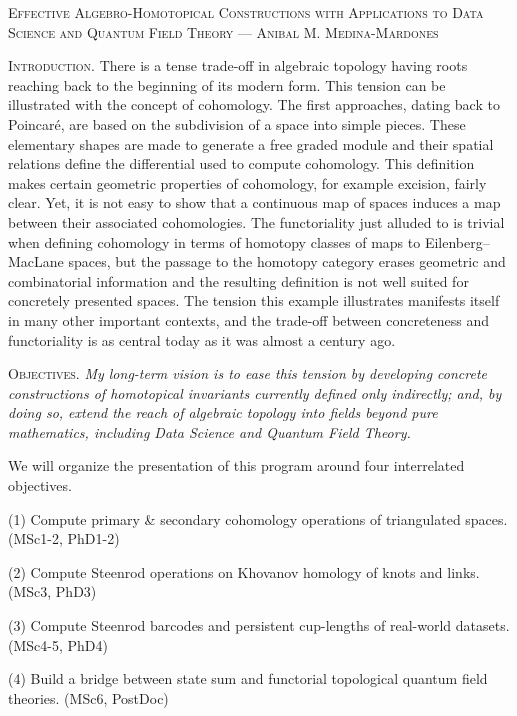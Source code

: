 
\textsc{\large Effective Algebro-Homotopical Constructions with Applications to Data Science and Quantum Field Theory}
--- \hfill \textsc{\large Anibal M. Medina-Mardones}

\bigskip\textsc{Introduction}.
There is a tense trade-off in algebraic topology having roots reaching back to the beginning of its modern form.
This tension can be illustrated with the concept of cohomology.
The first approaches, dating back to Poincar\'e, are based on the subdivision of a space into simple pieces.
These elementary shapes are made to generate a free graded module and their spatial relations define the differential used to compute cohomology.
This definition makes certain geometric properties of cohomology, for example excision, fairly clear.
Yet, it is not easy to show that a continuous map of spaces induces a map between their associated cohomologies.
The functoriality just alluded to is trivial when defining cohomology in terms of homotopy classes of maps to Eilenberg--MacLane spaces, but the passage to the homotopy category erases geometric and combinatorial information and the resulting definition is not well suited for concretely presented spaces.
The tension this example illustrates manifests itself in many other important contexts, and the trade-off between concreteness and functoriality is as central today as it was almost a century ago.

\smallskip\textsc{Objectives}.
\textit{My long-term vision is to ease this tension by developing concrete constructions of homotopical invariants currently defined only indirectly; and, by doing so, extend the reach of algebraic topology into fields beyond pure mathematics, including Data Science and Quantum Field Theory.}

\smallskip We will organize the presentation of this program around four interrelated objectives.

\smallskip
(1) Compute primary \& secondary cohomology operations of triangulated spaces. \hfill (MSc1-2, PhD1-2)\par
(2) Compute Steenrod operations on Khovanov homology of knots and links. \hfill (MSc3, PhD3)\par
(3) Compute Steenrod barcodes and persistent cup-lengths of real-world datasets. \hfill (MSc4-5, PhD4)\par
(4) Build a bridge between state sum and functorial topological quantum field theories. \hfill (MSc6, PostDoc)\par

